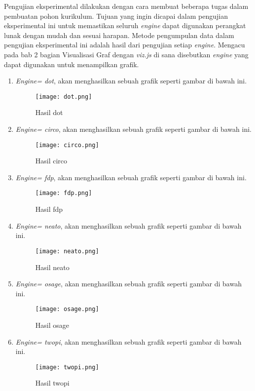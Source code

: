 Pengujian eksperimental dilakukan dengan cara membuat beberapa tugas dalam pembuatan pohon kurikulum. Tujuan yang ingin dicapai dalam pengujian eksperimental ini untuk memastikan seluruh \textit{engine} dapat digunakan perangkat lunak dengan mudah dan sesuai harapan. Metode pengumpulan data dalam pengujian eksperimental ini adalah hasil dari pengujian setiap \textit{engine}. Mengacu pada bab 2 bagian Visualisasi Graf dengan \textit{viz.js} di sana disebutkan \textit{engine} yang dapat digunakan untuk menampilkan grafik.

\begin{enumerate}
\item \textit{Engine= dot}, akan menghasilkan sebuah grafik seperti gambar di bawah ini.
\begin{figure}[H]
		\left
		\texttt{[image: dot.png]}
		\caption{Hasil dot}
		\label{fig: dot}
\end{figure}

\item \textit{Engine= circo}, akan menghasilkan sebuah grafik seperti gambar di bawah ini.
\begin{figure}[H]
		\left
		\texttt{[image: circo.png]}
		\caption{Hasil circo}
		\label{fig: circo}
\end{figure} 

\item \textit{Engine= fdp}, akan menghasilkan sebuah grafik seperti gambar di bawah ini.
\begin{figure}[H]
		\left
		\texttt{[image: fdp.png]}
		\caption{Hasil fdp}
		\label{fig: fdp}
\end{figure}

\item \textit{Engine= neato}, akan menghasilkan sebuah grafik seperti gambar di bawah ini.
\begin{figure}[H]
		\left
		\texttt{[image: neato.png]}
		\caption{Hasil neato}
		\label{fig: neato}
\end{figure}

\item \textit{Engine= osage}, akan menghasilkan sebuah grafik seperti gambar di bawah ini.
\begin{figure}[H]
		\left
		\texttt{[image: osage.png]}
		\caption{Hasil osage}
		\label{fig: osage}
\end{figure}

\item \textit{Engine= twopi}, akan menghasilkan sebuah grafik seperti gambar di bawah ini.
\begin{figure}[H]
		\left
		\texttt{[image: twopi.png]}
		\caption{Hasil twopi}
		\label{fig: twopi}
\end{figure}

\end{enumerate}